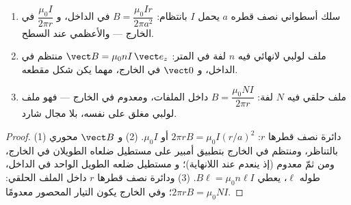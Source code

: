 \begin{proposition}\label{prop:b1:magnetostatics:ampereapps}
\begin{enumerate}
  \item سلك أسطواني نصف قطره $a$ يحمل $I$ بانتظام:
        $B = \dfrac{\mu_0Ir}{2\pi a^2}$ في الداخل، و $\dfrac{\mu_0I}{2\pi r}$ في الخارج
        --- والأعظمي عند السطح.
  \item ملف لولبي لانهائي فيه $n$ لفة في المتر: $\vect B = \mu_0nI\,
        \vect e_z$ منتظم في الداخل، و $\vect 0$ في الخارج، مهما يكن شكل
        مقطعه.
  \item ملف حلقي فيه $N$ لفة: $B = \dfrac{\mu_0NI}{2\pi r}$ داخل
        الملفات، ومعدوم في الخارج --- فهو ملف لولبي مغلق على نفسه، بلا
        مجال شارد.
\end{enumerate}
\end{proposition}

\begin{proof}
(1) دائرة نصف قطرها $r$: $2\pi rB = \mu_0I(r/a)^2$ أو $\mu_0I$. (2) و $\vect B$
محوري بالتناظر، ومنتظم في الخارج بتطبيق أمبير على مستطيل ضلعاه الطويلان
في الخارج، ومن ثمّ معدوم (إذ ينعدم عند اللانهاية)؛ و
مستطيل ضلعه الطويل الواحد في الداخل، طوله $\ell$، يعطي $B\ell =
\mu_0n\ell I$. (3) ودائرة نصف قطرها $r$ داخل الملف الحلقي: $2\pi rB =
\mu_0NI$؛ وفي الخارج يكون التيار المحصور معدومًا.
\end{proof}

